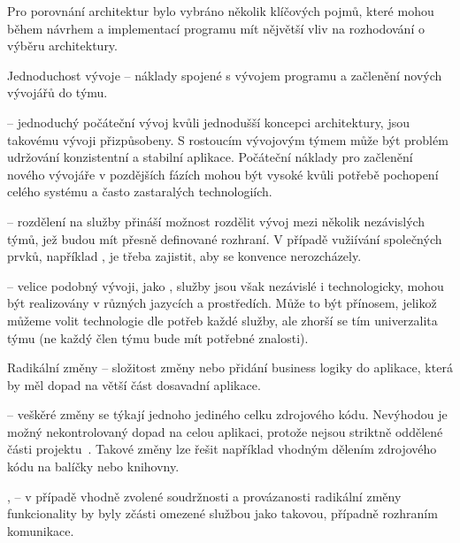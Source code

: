 Pro porovnání architektur bylo vybráno několik klíčových pojmů, které mohou během návrhem a implementací programu mít nějvětší vliv na rozhodování o výběru architektury.


\begin{dl}
   \item[Jednoduchost vývoje] – náklady spojené s vývojem programu a začlenění nových vývojářů do týmu.
\end{dl}
\begin{ul}
   \item {} – jednoduchý počáteční vývoj kvůli jednodušší koncepci architektury,  jsou takovému vývoji přizpůsobeny.
   S rostoucím vývojovým týmem může být problém udržování konzistentní a stabilní aplikace.
   Počáteční náklady pro začlenění nového vývojáře v pozdějších fázích mohou být vysoké kvůli potřebě pochopení celého systému a často zastaralých technologiích.~\cite{msachris}
   \item {} – rozdělení na služby přináší možnost rozdělit vývoj mezi několik nezávislých týmů, jež budou mít přesně definované rozhraní.
   V případě vužiívání společných prvků, například , je třeba zajistit, aby se konvence nerozcházely.
   \item {} – velice podobný vývoji, jako , služby jsou však nezávislé i technologicky, mohou být realizovány v různých jazycích a prostředích.
   Může to být přínosem, jelikož můžeme volit technologie dle potřeb každé služby, ale zhorší se tím univerzalita týmu (ne každý člen týmu bude mít potřebné znalosti).
\end{ul}

\begin{dl}
   \item[Radikální změny] – složitost změny nebo přidání business logiky do aplikace, která by měl dopad na větší část dosavadní aplikace.
\end{dl}
\begin{ul}
   \item {} – veškěré změny se týkají jednoho jediného celku zdrojového kódu.
   Nevýhodou je možný nekontrolovaný dopad na celou aplikaci, protože nejsou striktně oddělené části projektu~\cite{msachris}.
   Takové změny lze řešit například vhodným dělením zdrojového kódu na balíčky nebo knihovny.
   \item {},  – v případě vhodně zvolené soudržnosti a provázanosti radikální změny funkcionality by byly zčásti omezené službou jako takovou, případně rozhraním komunikace.
\end{ul}

